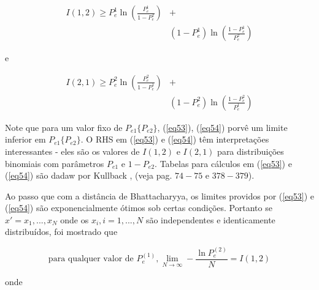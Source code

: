 \documentclass{sbrt2017port}
\begin{document}
\begin{equation}\label{eq53}
	\begin{split}
		I(1,2) \geq P_e^1 \ln (\frac{P_e^1}{1 - P_e^2}) & + \\
		& (1 - P_e^1) \ln (\frac{1 - P_e^1}{P_e^2})
	\end{split}
\end{equation}

e

\begin{equation}\label{eq54}
	\begin{split}
		I(2,1) \geq P_e^2 \ln (\frac{P_e^2}{1 - P_e^1}) & + \\
		& (1 - P_e^2) \ln (\frac{1 - P_e^2}{P_e^1})
	\end{split}
\end{equation}

Note que para um valor fixo de $P_{e1}\{P_{e2}\}$, (\ref{eq53}), {(\ref{eq54})} porvê um limite inferior em $P_{e1}\{P_{e2}\}$. O RHS em (\ref{eq53}) e (\ref{eq54}) têm interpretações interessantes - eles são os valores de $I(1,2)$ e $I(2,1)$ para distribuições binomiais com parâmetros $P_{e1}$ e $1-P_{e2}$. Tabelas para cálculos em (\ref{eq53}) e (\ref{eq54}) são dadaw por Kullback \cite{r8}, (veja pag. $74-75$ e $378-379$).

Ao passo que com a distância de Bhattacharyya, os limites providos por (\ref{eq53}) e (\ref{eq54}) são exponencialmente ótimos sob certas condições. Portanto se $x' = x_1, ...,x_N$ onde os $x_i, i=1,...,N$ são independentes e identicamente distribuídos, foi mostrado que

\begin{equation*}
	\text{para qualquer valor de }P_e^{(1)}, \lim_{N \rightarrow \infty} - \frac{\ln P_e^{(2)} }{N} = I(1,2) 
\end{equation*}

onde
\end{document}
